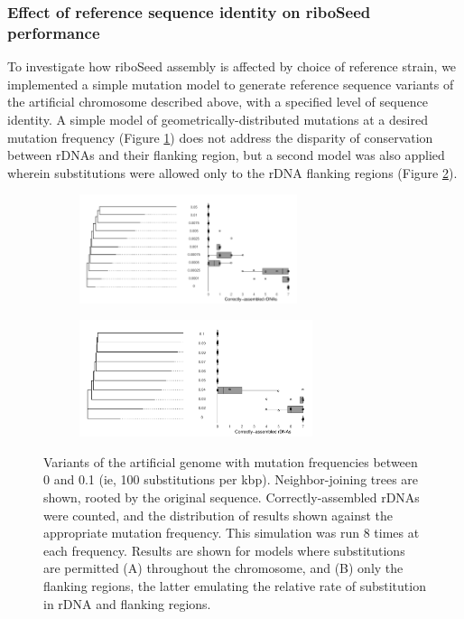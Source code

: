 \documentclass[11pt]{article}
\begin{document}
\begin{linenumbers}
\subsubsection*{Effect of reference sequence identity on riboSeed performance}
To investigate how riboSeed assembly is affected by choice of reference strain, we implemented a simple mutation model to generate reference sequence variants of the artificial chromosome described above, with a specified level of sequence identity.  A simple model of geometrically-distributed mutations at a desired mutation frequency (Figure \ref{fig:degenA}) does not address the disparity of conservation between rDNAs and their flanking region, but a second model was also applied wherein substitutions were allowed only to the rDNA flanking regions (Figure \ref{fig:degenB}).

\begin{figure}[H]
  \centering
  \begin{subfigure}[b]{0.9\textwidth}
    \includegraphics[width=0.7\textwidth]{all_degen}
    \caption{}
    \label{fig:degenA}
  \end{subfigure}
  \begin{subfigure}[b]{0.9\textwidth}
    \includegraphics[width=0.75\textwidth]{flanking_degen}
    \caption{}
    \label{fig:degenB}
  \end{subfigure}

  \caption{Variants of the artificial genome with mutation frequencies between 0 and 0.1 (ie, 100 substitutions per kbp). Neighbor-joining trees are shown, rooted by the original sequence. Correctly-assembled rDNAs were counted, and the distribution of results shown against the appropriate mutation frequency. This simulation was run 8 times at each frequency. Results are shown for models where substitutions are permitted (A) throughout the chromosome, and (B) only the flanking regions, the latter emulating the relative rate of substitution in rDNA and flanking regions.}
  \label{fig:degen}
\end{figure}


\end{linenumbers}
\end{document}
